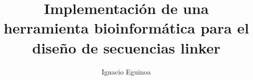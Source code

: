 \documentclass{beamer}
\title{Implementación de una herramienta bioinformática para el diseño de secuencias linker}
\date{}
\author{Ignacio Eguinoa}
\institute[VFU] %
{ Laboratorio de Fisiología de proteínas\\ 
Departamento de Química Biológica \\
Facultad de Ciencias Exactas y Naturales - IQUIBICEN - CONICET\\
Universidad de Buenos Aires}
\begin{document}
% 



\begin{frame}
\vspace{20px}
\titlepage
\end{frame}
\end{document}
